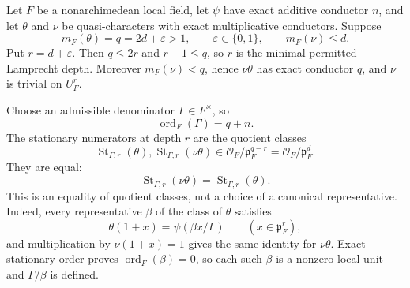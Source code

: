\begin{theorem}\label{mod:lamprecht-stabletwist}
Let $F$ be a nonarchimedean local field, let $\psi$ have exact additive
conductor $n$, and let $\theta$ and $\nu$ be quasi-characters with exact
multiplicative conductors.  Suppose
\[
 m_F(\theta)=q=2d+\varepsilon>1,
 \qquad \varepsilon\in\{0,1\},
 \qquad m_F(\nu)\leq d.
\]
Put $r=d+\varepsilon$.  Then $q\leq2r$ and $r+1\leq q$, so $r$ is the
minimal permitted Lamprecht depth.  Moreover $m_F(\nu)<q$, hence
$\nu\theta$ has exact conductor $q$, and $\nu$ is trivial on $U_F^r$.

Choose an admissible denominator $\Gamma\in F^\times$, so
\[
 \operatorname{ord}_F(\Gamma)=q+n.
\]
The stationary numerators at depth $r$ are the quotient classes
\[
 \operatorname{St}_{\Gamma,r}(\theta),
 \operatorname{St}_{\Gamma,r}(\nu\theta)
 \in \mathcal O_F/\mathfrak p_F^{q-r}
     =\mathcal O_F/\mathfrak p_F^d.
\]
They are equal:
\[
 \operatorname{St}_{\Gamma,r}(\nu\theta)
 =\operatorname{St}_{\Gamma,r}(\theta).
\]
This is an equality of quotient classes, not a choice of a canonical
representative.  Indeed, every representative $\beta$ of the class of
$\theta$ satisfies
\[
 \theta(1+x)=\psi(\beta x/\Gamma)
 \qquad(x\in\mathfrak p_F^r),
\]
and multiplication by $\nu(1+x)=1$ gives the same identity for
$\nu\theta$.  Exact stationary order proves
$\operatorname{ord}_F(\beta)=0$, so each such $\beta$ is a nonzero local
unit and $\Gamma/\beta$ is defined.


\end{theorem}
